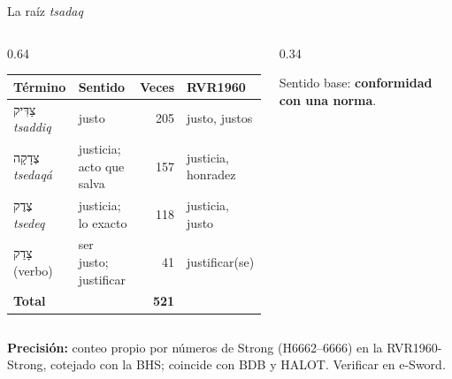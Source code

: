 \documentclass[hyperref={bookmarks=false},aspectratio=169]{beamer}
\newcommand{\heb}[1]{\mbox{\foreignlanguage{hebrew}{#1}}}
\newcommand{\destacar}[1]{\textbf{\textcolor{azul}{#1}}}
\newcommand{\precision}[1]{{\footnotesize\color{gris}\textbf{Precisión:} #1}}
\begin{document}
\begin{frame}{La raíz \emph{tsadaq}}
\begin{columns}[c,onlytextwidth]
\begin{column}{0.64\textwidth}
\scriptsize\renewcommand{\arraystretch}{1.18}
\begin{tabular}{@{}>{\RaggedRight\arraybackslash}p{1.8cm}>{\RaggedRight\arraybackslash}p{2.3cm}r>{\RaggedRight\arraybackslash}p{1.9cm}@{}}
\toprule
\textbf{Término} & \textbf{Sentido} & \textbf{Veces} & \textbf{RVR1960} \\ \midrule
\heb{צַדִּיק} \emph{tsaddiq} & justo & 205 & justo, justos \\
\heb{צְדָקָה} \emph{tsedaqá} & justicia; acto que salva & 157 & justicia, honradez \\
\heb{צֶדֶק} \emph{tsedeq} & justicia; lo exacto & 118 & justicia, justo \\
\heb{צָדַק} (verbo) & ser justo; justificar & 41 & justificar(se) \\ \midrule
\textbf{Total} & & \textbf{521} & \\
\bottomrule
\end{tabular}
\end{column}
\begin{column}{0.34\textwidth}
\par\smallskip
\small Sentido base: \destacar{conformidad con una norma}.
\end{column}
\end{columns}\par\smallskip
\precision{conteo propio por números de Strong (H6662--6666) en la RVR1960-Strong, cotejado con la BHS; coincide con BDB y HALOT. Verificar en e-Sword.}
\end{frame}
\end{document}
